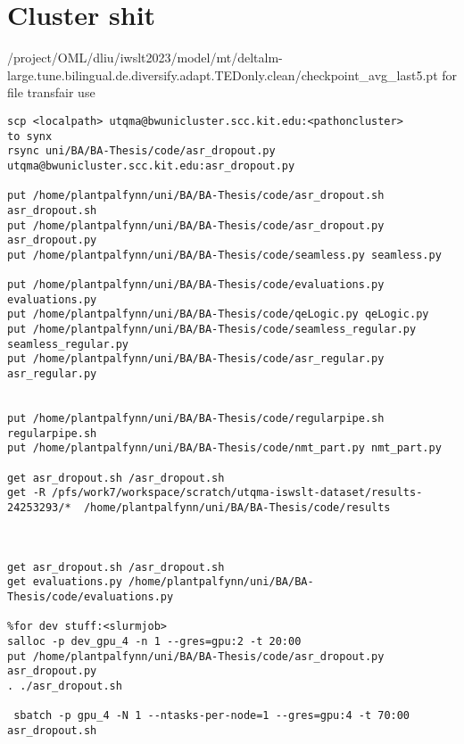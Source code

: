 \section{Cluster shit}
/project/OML/dliu/iwslt2023/model/mt/deltalm-large.tune.bilingual.de.diversify.adapt.TEDonly.clean/checkpoint_avg_last5.pt
for file transfair use
\begin{verbatim}
scp <localpath> utqma@bwunicluster.scc.kit.edu:<pathoncluster>
to synx
rsync uni/BA/BA-Thesis/code/asr_dropout.py utqma@bwunicluster.scc.kit.edu:asr_dropout.py

put /home/plantpalfynn/uni/BA/BA-Thesis/code/asr_dropout.sh asr_dropout.sh
put /home/plantpalfynn/uni/BA/BA-Thesis/code/asr_dropout.py asr_dropout.py
put /home/plantpalfynn/uni/BA/BA-Thesis/code/seamless.py seamless.py

put /home/plantpalfynn/uni/BA/BA-Thesis/code/evaluations.py evaluations.py
put /home/plantpalfynn/uni/BA/BA-Thesis/code/qeLogic.py qeLogic.py
put /home/plantpalfynn/uni/BA/BA-Thesis/code/seamless_regular.py seamless_regular.py
put /home/plantpalfynn/uni/BA/BA-Thesis/code/asr_regular.py asr_regular.py


put /home/plantpalfynn/uni/BA/BA-Thesis/code/regularpipe.sh regularpipe.sh
put /home/plantpalfynn/uni/BA/BA-Thesis/code/nmt_part.py nmt_part.py

get asr_dropout.sh /asr_dropout.sh
get -R /pfs/work7/workspace/scratch/utqma-iswslt-dataset/results-24253293/*  /home/plantpalfynn/uni/BA/BA-Thesis/code/results



get asr_dropout.sh /asr_dropout.sh
get evaluations.py /home/plantpalfynn/uni/BA/BA-Thesis/code/evaluations.py
 
%for dev stuff:<slurmjob>
salloc -p dev_gpu_4 -n 1 --gres=gpu:2 -t 20:00
put /home/plantpalfynn/uni/BA/BA-Thesis/code/asr_dropout.py asr_dropout.py
. ./asr_dropout.sh

 sbatch -p gpu_4 -N 1 --ntasks-per-node=1 --gres=gpu:4 -t 70:00 asr_dropout.sh

\end{verbatim}

